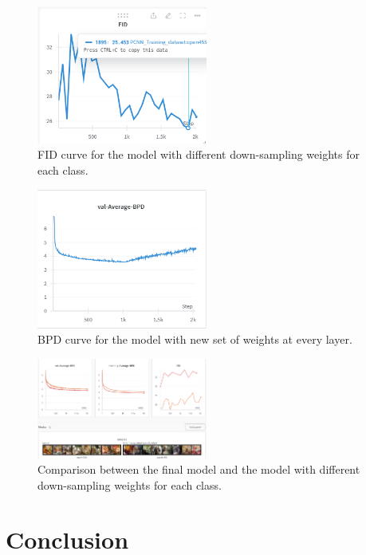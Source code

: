 \documentclass{article}
\begin{document}
\begin{figure}
    \centering
    \includegraphics[width=0.5\textwidth]{report_data/f_1_fid.png}
    \caption{ FID curve for the model with different down-sampling weights for each class.}
    \label{fig:F-FID}
  \end{figure}

\begin{figure}
    \centering
    \includegraphics[width=0.5\textwidth]{report_data/f_2_BPD.png}
    \caption{BPD curve for the model with new set of weights at every layer.}
    \label{fig:F-BPD}
  \end{figure}
  \begin{figure}
    \centering
    \includegraphics[width=0.5\textwidth]{report_data/f_pp_cmp.png}
    \caption{Comparison between the final model and the model with different down-sampling weights for each class.}
    \label{fig:F-BPD}
  \end{figure}

\section{Conclusion}
\end{document}
